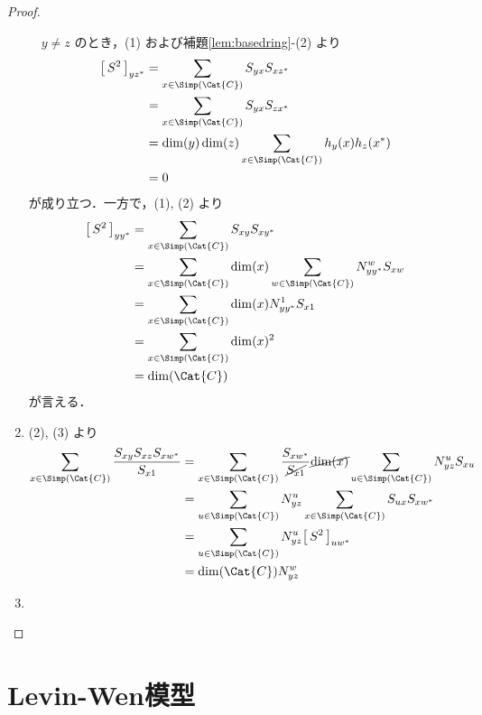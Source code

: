 \documentclass[TQFT_main]{subfiles}
\begin{document}
\begin{proof}
\begin{enumerate}
        　$y \neq z$ のとき，(1) および補題\ref{lem:basedring}-(2) より
        \begin{align}
            \bigl[\, S^2 \,\bigr]_{yz^*}
            &= \sum_{x \in \Simp(\Cat{C})} S_{yx} S_{xz^{*}} \\
            &= \sum_{x \in \Simp(\Cat{C})} S_{yx} S_{zx^*} \\
            &= \dim (y) \dim (z)\sum_{x \in \Simp(\Cat{C})} h_y(x) h_z (x^*) \\
            &= 0
        \end{align}
        が成り立つ．一方で，(1), (2) より
        \begin{align}
            \bigl[\, S^2 \,\bigr]_{yy^*}
            &= \sum_{x \in \Simp(\Cat{C})} S_{xy} S_{xy^{*}} \\
            &= \sum_{x \in \Simp(\Cat{C})} \dim(x) \sum_{w \in \Simp(\Cat{C})} N^w_{yy^*} S_{xw} \\
            &= \sum_{x \in \Simp(\Cat{C})} \dim(x) N^1_{yy^*} S_{x1} \\
            &= \sum_{x \in \Simp(\Cat{C})} \dim(x)^2 \\
            &= \dim (\Cat{C})
        \end{align}
        が言える．
        \item (2), (3) より
        \begin{align}
            \sum_{x \in \Simp(\Cat{C})} \frac{S_{xy} S_{xz} S_{xw^*}}{S_{x1}} 
            &= \sum_{x \in \Simp(\Cat{C})} \frac{S_{xw^*}}{\cancel{S_{x1}}} \cancel{\dim (x)} \sum_{u \in \Simp(\Cat{C})} N^u_{yz} S_{xu} \\
            &= \sum_{u \in \Simp(\Cat{C})} N^u_{yz} \sum_{x \in \Simp(\Cat{C})} S_{ux} S_{xw^*} \\
            &= \sum_{u \in \Simp(\Cat{C})} N^u_{yz} \bigl[\, S^2 \,\bigr]_{uw^*} \\
            &= \dim (\Cat{C}) N^w_{yz}
        \end{align}
        \item 
    \end{enumerate}
    
\end{proof}


\section{Levin-Wen模型}
\end{document}
